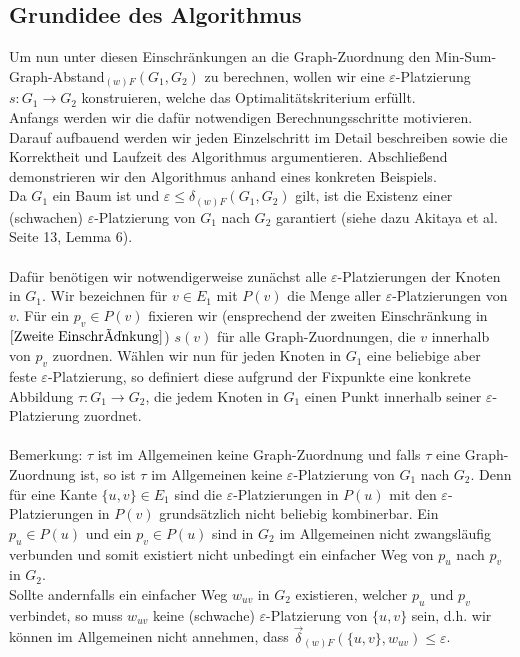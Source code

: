 \documentclass[a4paper, 12pt, twoside]{article}
\theoremstyle{Format1} %
\begin{document}
\subsection{Grundidee des Algorithmus}
Um nun unter diesen Einschränkungen an die Graph-Zuordnung den Min-Sum-Graph-Abstand$_{(w)F}(G_1,G_2)$ zu berechnen, wollen wir
eine $\varepsilon$-Platzierung $s: G_1 \to G_2$ konstruieren, welche das Optimalitätskriterium erfüllt.
\\
Anfangs werden wir die dafür notwendigen Berechnungsschritte motivieren.
Darauf aufbauend werden wir jeden Einzelschritt im Detail beschreiben sowie die Korrektheit und Laufzeit des Algorithmus argumentieren.
Abschließend demonstrieren wir den Algorithmus anhand eines konkreten Beispiels.
\\
Da $G_1$ ein Baum ist und $\varepsilon \leq \delta_{(w)F}(G_1, G_2)$ gilt,
ist die Existenz einer (schwachen) $\varepsilon$-Platzierung von $G_1$ nach $G_2$ garantiert (siehe dazu Akitaya et al. Seite 13, Lemma 6).
\\
\\
Dafür benötigen wir notwendigerweise zunächst alle $\varepsilon$-Platzierungen der Knoten in $G_1$.
Wir bezeichnen für $v \in E_1$ mit $P(v)$ die Menge aller $\varepsilon$-Platzierungen von $v$.
Für ein $p_v \in P(v)$ fixieren wir (ensprechend der zweiten Einschränkung in $\ref{Zweite Einschränkung}$) $s(v)$ für alle Graph-Zuordnungen,
die $v$ innerhalb von $p_v$ zuordnen. Wählen wir nun für jeden Knoten in $G_1$ eine beliebige aber feste $\varepsilon$-Platzierung, so definiert diese aufgrund der Fixpunkte
eine konkrete Abbildung $\tau: G_1 \to G_2$, die jedem Knoten in $G_1$ einen Punkt innerhalb seiner $\varepsilon$-Platzierung zuordnet.
\\
\\
Bemerkung:
$\tau$ ist im Allgemeinen keine Graph-Zuordnung und falls $\tau$ eine Graph-Zuordnung ist, so ist $\tau$ im Allgemeinen keine $\varepsilon$-Platzierung von $G_1$ nach $G_2$.
Denn für eine Kante $\{u, v\} \in E_1$ sind die $\varepsilon$-Platzierungen in $P(u)$ mit den $\varepsilon$-Platzierungen in $P(v)$ grundsätzlich nicht beliebig kombinerbar.
Ein $p_u \in P(u)$ und ein $p_v \in P(u)$ sind in $G_2$ im Allgemeinen nicht zwangsläufig verbunden und somit existiert nicht unbedingt ein einfacher Weg von $p_u$ nach $p_v$ in $G_2$.
\\
Sollte andernfalls ein einfacher Weg $w_{uv}$ in $G_2$ existieren, welcher $p_u$ und $p_v$ verbindet, so muss $w_{uv}$ keine (schwache) $\varepsilon$-Platzierung
von $\{u,v\}$ sein, d.h. wir können im Allgemeinen nicht annehmen, dass $\vec{\delta}_{(w)F}(\{u,v\}, w_{uv}) \leq \varepsilon$.
\end{document}
